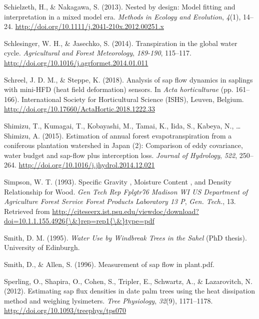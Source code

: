 \documentclass[11pt,twoside]{reedthesis}
\begin{document}
\hypertarget{ref-Schielzeth2013}{}
Schielzeth, H., \& Nakagawa, S. (2013). Nested by design: Model fitting
and interpretation in a mixed model era. \emph{Methods in Ecology and
Evolution}, \emph{4}(1), 14--24.
\url{http://doi.org/10.1111/j.2041-210x.2012.00251.x}

\hypertarget{ref-Schlesinger2014}{}
Schlesinger, W. H., \& Jasechko, S. (2014). Transpiration in the global
water cycle. \emph{Agricultural and Forest Meteorology}, \emph{189-190},
115--117. \url{http://doi.org/10.1016/j.agrformet.2014.01.011}

\hypertarget{ref-Schreel2018}{}
Schreel, J. D. M., \& Steppe, K. (2018). Analysis of sap flow dynamics
in saplings with mini-HFD (heat field deformation) sensors. In
\emph{Acta horticulturae} (pp. 161--166). International Society for
Horticultural Science (ISHS), Leuven, Belgium.
\url{http://doi.org/10.17660/ActaHortic.2018.1222.33}

\hypertarget{ref-Shimizu2015}{}
Shimizu, T., Kumagai, T., Kobayashi, M., Tamai, K., Iida, S., Kabeya,
N., \ldots{} Shimizu, A. (2015). Estimation of annual forest
evapotranspiration from a coniferous plantation watershed in Japan (2):
Comparison of eddy covariance, water budget and sap-flow plus
interception loss. \emph{Journal of Hydrology}, \emph{522}, 250--264.
\url{http://doi.org/10.1016/j.jhydrol.2014.12.021}

\hypertarget{ref-Simpson1993}{}
Simpson, W. T. (1993). Specific Gravity , Moisture Content , and Density
Relationship for Wood. \emph{Gen Tech Rep Fplgtr76 Madison WI US
Department of Agriculture Forest Service Forest Products Laboratory 13
P}, \emph{Gen. Tech.}, 13. Retrieved from
\href{http://citeseerx.ist.psu.edu/viewdoc/download?doi=10.1.1.155.4926\%7B/\&\%7Drep=rep1\%7B/\&\%7Dtype=pdf}{http://citeseerx.ist.psu.edu/viewdoc/download?doi=10.1.1.155.4926\{\textbackslash{}\&\}rep=rep1\{\textbackslash{}\&\}type=pdf}

\hypertarget{ref-Smith1995}{}
Smith, D. M. (1995). \emph{Water Use by Windbreak Trees in the Sahel}
(PhD thesis). University of Edinburgh.

\hypertarget{ref-Smith1996}{}
Smith, D., \& Allen, S. (1996). Measurement of sap flow in plant.pdf.

\hypertarget{ref-Sperling2012}{}
Sperling, O., Shapira, O., Cohen, S., Tripler, E., Schwartz, A., \&
Lazarovitch, N. (2012). Estimating sap flux densities in date palm trees
using the heat dissipation method and weighing lysimeters. \emph{Tree
Physiology}, \emph{32}(9), 1171--1178.
\url{http://doi.org/10.1093/treephys/tps070}
\end{document}
